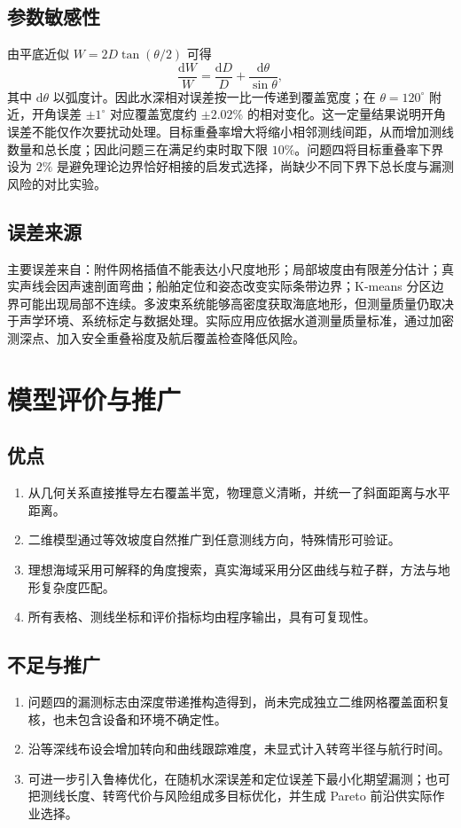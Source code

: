 \documentclass[withoutpreface,notoc]{cumcmthesis}
\begin{document}
\subsection{参数敏感性}
由平底近似 $W=2D\tan(\theta/2)$ 可得
\[
\frac{\mathrm dW}{W}=\frac{\mathrm dD}{D}+\frac{\mathrm d\theta}{\sin\theta},
\]
其中 $\mathrm d\theta$ 以弧度计。因此水深相对误差按一比一传递到覆盖宽度；在 $\theta=120^\circ$ 附近，开角误差 $\pm1^\circ$ 对应覆盖宽度约 $\pm2.02\%$ 的相对变化。这一定量结果说明开角误差不能仅作次要扰动处理。目标重叠率增大将缩小相邻测线间距，从而增加测线数量和总长度；因此问题三在满足约束时取下限 $10\%$。问题四将目标重叠率下界设为 $2\%$ 是避免理论边界恰好相接的启发式选择，尚缺少不同下界下总长度与漏测风险的对比实验。

\subsection{误差来源}
主要误差来自：附件网格插值不能表达小尺度地形；局部坡度由有限差分估计；真实声线会因声速剖面弯曲；船舶定位和姿态改变实际条带边界；K-means 分区边界可能出现局部不连续。多波束系统能够高密度获取海底地形，但测量质量仍取决于声学环境、系统标定与数据处理\cite{hughesclarke}。实际应用应依据水道测量质量标准\cite{iho44}，通过加密测深点、加入安全重叠裕度及航后覆盖检查降低风险。

\section{模型评价与推广}
\subsection{优点}
\begin{enumerate}[label=\arabic*.]
  \item 从几何关系直接推导左右覆盖半宽，物理意义清晰，并统一了斜面距离与水平距离。
  \item 二维模型通过等效坡度自然推广到任意测线方向，特殊情形可验证。
  \item 理想海域采用可解释的角度搜索，真实海域采用分区曲线与粒子群，方法与地形复杂度匹配。
  \item 所有表格、测线坐标和评价指标均由程序输出，具有可复现性。
\end{enumerate}

\subsection{不足与推广}
\begin{enumerate}[label=\arabic*.]
  \item 问题四的漏测标志由深度带递推构造得到，尚未完成独立二维网格覆盖面积复核，也未包含设备和环境不确定性。
  \item 沿等深线布设会增加转向和曲线跟踪难度，未显式计入转弯半径与航行时间。
  \item 可进一步引入鲁棒优化，在随机水深误差和定位误差下最小化期望漏测；也可把测线长度、转弯代价与风险组成多目标优化，并生成 Pareto 前沿供实际作业选择。
\end{enumerate}
\end{document}
